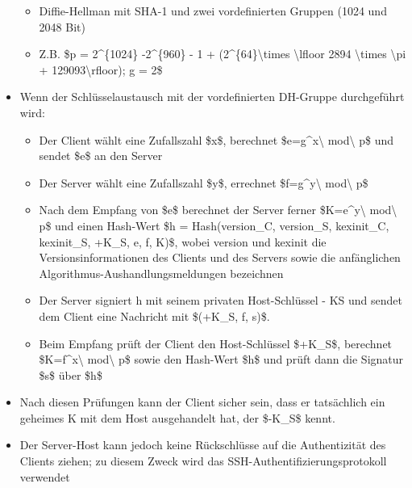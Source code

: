 \documentclass[a4paper]{article}
\begin{document}
\begin{multicols}{3}
\begin{itemize}
              \begin{itemize}
                  \item
                        Diffie-Hellman mit SHA-1 und zwei vordefinierten Gruppen (1024 und
                        2048 Bit)
                  \item
                        Z.B. \$p = 2\^{}\{1024\} -2\^{}\{960\} - 1 +
                        (2\^{}\{64\}\textbackslash times \textbackslash lfloor 2894
                        \textbackslash times \textbackslash pi +
                        129093\textbackslash rfloor); g = 2\$
              \end{itemize}
        \item
              Wenn der Schlüsselaustausch mit der vordefinierten DH-Gruppe
              durchgeführt wird:

              \begin{itemize}
                  \item
                        Der Client wählt eine Zufallszahl \$x\$, berechnet
                        \$e=g\^{}x\textbackslash{} mod\textbackslash{} p\$ und sendet \$e\$
                        an den Server
                  \item
                        Der Server wählt eine Zufallszahl \$y\$, errechnet
                        \$f=g\^{}y\textbackslash{} mod\textbackslash{} p\$
                  \item
                        Nach dem Empfang von \$e\$ berechnet der Server ferner
                        \$K=e\^{}y\textbackslash{} mod\textbackslash{} p\$ und einen
                        Hash-Wert \$h = Hash(version\_C, version\_S, kexinit\_C, kexinit\_S,
                        +K\_S, e, f, K)\$, wobei version und kexinit die
                        Versionsinformationen des Clients und des Servers sowie die
                        anfänglichen Algorithmus-Aushandlungsmeldungen bezeichnen
                  \item
                        Der Server signiert h mit seinem privaten Host-Schlüssel - KS und
                        sendet dem Client eine Nachricht mit \$(+K\_S, f, s)\$.
                  \item
                        Beim Empfang prüft der Client den Host-Schlüssel \$+K\_S\$,
                        berechnet \$K=f\^{}x\textbackslash{} mod\textbackslash{} p\$ sowie
                        den Hash-Wert \$h\$ und prüft dann die Signatur \$s\$ über \$h\$
              \end{itemize}
        \item
              Nach diesen Prüfungen kann der Client sicher sein, dass er tatsächlich
              ein geheimes K mit dem Host ausgehandelt hat, der \$-K\_S\$ kennt.
        \item
              Der Server-Host kann jedoch keine Rückschlüsse auf die Authentizität
              des Clients ziehen; zu diesem Zweck wird das
              SSH-Authentifizierungsprotokoll verwendet
    \end{itemize}



\end{multicols}
\end{document}
